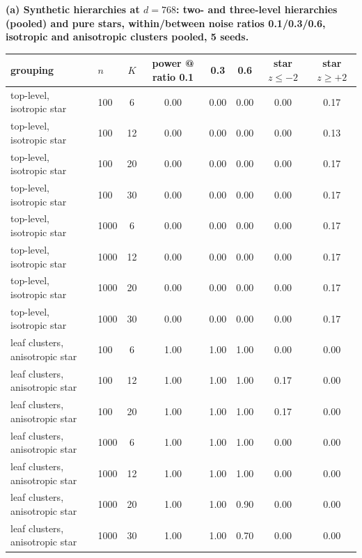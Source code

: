 \begin{table}[H]
\centering
\scriptsize
\setlength{\tabcolsep}{2pt}
\begingroup
\noindent\textbf{(a) Synthetic hierarchies at $d{=}768$: two- and three-level hierarchies (pooled) and pure stars, within/between noise ratios 0.1/0.3/0.6, isotropic and anisotropic clusters pooled, 5 seeds.}\par\vspace{1.5pt}
\footnotesize
\setlength{\tabcolsep}{4pt}
\begin{tabular}{llcccccc}
\toprule
grouping & $n$ & $K$ & power @ ratio 0.1 & 0.3 & 0.6 & star $z\le-2$ & star $z\ge+2$ \\
\midrule
top-level, isotropic star & 100 & 6 & 0.00 & 0.00 & 0.00 & 0.00 & 0.17 \\
top-level, isotropic star & 100 & 12 & 0.00 & 0.00 & 0.00 & 0.00 & 0.13 \\
top-level, isotropic star & 100 & 20 & 0.00 & 0.00 & 0.00 & 0.00 & 0.17 \\
top-level, isotropic star & 100 & 30 & 0.00 & 0.00 & 0.00 & 0.00 & 0.17 \\
top-level, isotropic star & 1000 & 6 & 0.00 & 0.00 & 0.00 & 0.00 & 0.17 \\
top-level, isotropic star & 1000 & 12 & 0.00 & 0.00 & 0.00 & 0.00 & 0.17 \\
top-level, isotropic star & 1000 & 20 & 0.00 & 0.00 & 0.00 & 0.00 & 0.17 \\
top-level, isotropic star & 1000 & 30 & 0.00 & 0.00 & 0.00 & 0.00 & 0.17 \\
\midrule
leaf clusters, anisotropic star & 100 & 6 & 1.00 & 1.00 & 1.00 & 0.00 & 0.00 \\
leaf clusters, anisotropic star & 100 & 12 & 1.00 & 1.00 & 1.00 & 0.17 & 0.00 \\
leaf clusters, anisotropic star & 100 & 20 & 1.00 & 1.00 & 1.00 & 0.17 & 0.00 \\
leaf clusters, anisotropic star & 1000 & 6 & 1.00 & 1.00 & 1.00 & 0.00 & 0.00 \\
leaf clusters, anisotropic star & 1000 & 12 & 1.00 & 1.00 & 1.00 & 0.00 & 0.00 \\
leaf clusters, anisotropic star & 1000 & 20 & 1.00 & 1.00 & 0.90 & 0.00 & 0.00 \\
leaf clusters, anisotropic star & 1000 & 30 & 1.00 & 1.00 & 0.70 & 0.00 & 0.00 \\

\end{tabular}
\end{table}
